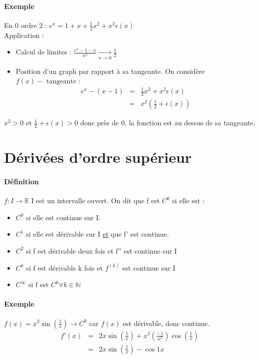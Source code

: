 \paragraph{Exemple} En $0$ ordre 2 : $e^x = 1+x+\frac{1}{2}x^2+x^2\epsilon (x)$ ~\\
Application : 
\begin{itemize}
	\item Calcul de limites : $\frac{e^x-1-x}{x^2} \xrightarrow[x \to 0]{} \frac{1}{2}$
	\item Position d'un graph par rapport à sa tangeante. On considère $f(x) - \text{ tangeante }$: \[\begin{array}{rcl}
		e^x - (x-1) &=& \frac{1}{2}x^2 + x^2 \epsilon(x) \\
											   &=& x^2(\frac{1}{2}+\epsilon(x))
\end{array}\]
\end{itemize}

$x^2 > 0$ et $\frac{1}{2} + \epsilon (x) > 0$ donc près de 0, la fonction est au dessus de sa tangeante.

\section{Dérivées d'ordre supérieur}

\paragraph{Définition} $f : I \rightarrow \mathbb{R}$ I est un intervalle ouvert.
On dit que f est $C^0$ si elle est : 
\begin{itemize}
	\item $C^0$ si elle est continue sur I.
	\item $C^1$ si elle est dérivable sur I \ul{et} que f' est continue.
	\item $C^2$ si f est dérivable deux fois et f'' est continue sur I
	\item $C^k$ si f est dérivable k fois et $f^{(k)}$ est continue sur I
	\item $C^\infty$ si f est $C^k \forall k \in \mathbb{N}$
\end{itemize}

\paragraph{Exemple}

$f(x)=x^2\sin(\frac{1}{x}) \rightarrow C^0$ car $f(x)$ est dérivable, donc continue.
\[\begin{array}{rcl}
		f'(x) &=& 2x \sin(\frac{1}{x})+x^2(\frac{-1}{x^2})\cos(\frac{1}{x}) \\
					   &=& 2x\sin(\frac{1}{x}) - \cos{1}{x}
\end{array}\]

